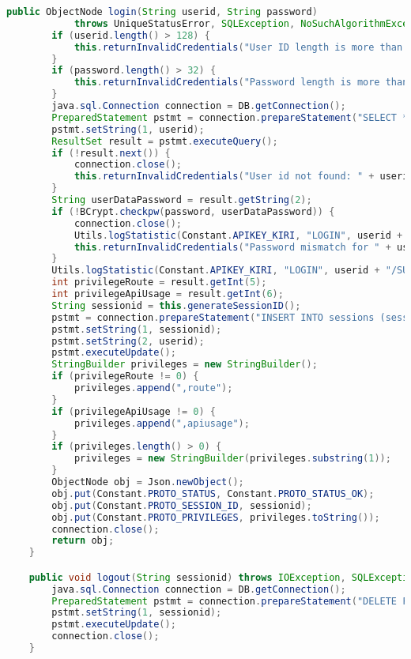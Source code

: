 \begin{lstlisting}[language=Java,basicstyle=\tiny,caption=models/AuthenticationManager.java,label={lst:authenticationmanager.java}]
	public ObjectNode login(String userid, String password)
			throws UniqueStatusError, SQLException, NoSuchAlgorithmException, UnsupportedEncodingException {
		if (userid.length() > 128) {
			this.returnInvalidCredentials("User ID length is more than allowed (" + userid.length() + ")");
		}
		if (password.length() > 32) {
			this.returnInvalidCredentials("Password length is more than allowed (" + password.length() + ")");
		}
		java.sql.Connection connection = DB.getConnection();
		PreparedStatement pstmt = connection.prepareStatement("SELECT * FROM users WHERE email=?;");
		pstmt.setString(1, userid);
		ResultSet result = pstmt.executeQuery();
		if (!result.next()) {
			connection.close();
			this.returnInvalidCredentials("User id not found: " + userid);
		}
		String userDataPassword = result.getString(2);
		if (!BCrypt.checkpw(password, userDataPassword)) {
			connection.close();
			Utils.logStatistic(Constant.APIKEY_KIRI, "LOGIN", userid + "/FAIL");
			this.returnInvalidCredentials("Password mismatch for " + userid);
		}
		Utils.logStatistic(Constant.APIKEY_KIRI, "LOGIN", userid + "/SUCCESS");
		int privilegeRoute = result.getInt(5);
		int privilegeApiUsage = result.getInt(6);
		String sessionid = this.generateSessionID();
		pstmt = connection.prepareStatement("INSERT INTO sessions (sessionId, email) VALUES (?,?);");
		pstmt.setString(1, sessionid);
		pstmt.setString(2, userid);
		pstmt.executeUpdate();
		StringBuilder privileges = new StringBuilder();
		if (privilegeRoute != 0) {
			privileges.append(",route");
		}
		if (privilegeApiUsage != 0) {
			privileges.append(",apiusage");
		}
		if (privileges.length() > 0) {
			privileges = new StringBuilder(privileges.substring(1));
		}
		ObjectNode obj = Json.newObject();
		obj.put(Constant.PROTO_STATUS, Constant.PROTO_STATUS_OK);
		obj.put(Constant.PROTO_SESSION_ID, sessionid);
		obj.put(Constant.PROTO_PRIVILEGES, privileges.toString());
		connection.close();
		return obj;
	}

	public void logout(String sessionid) throws IOException, SQLException {
		java.sql.Connection connection = DB.getConnection();
		PreparedStatement pstmt = connection.prepareStatement("DELETE FROM sessions WHERE sessionId=?");
		pstmt.setString(1, sessionid);
		pstmt.executeUpdate();
		connection.close();
	}


\end{lstlisting}
